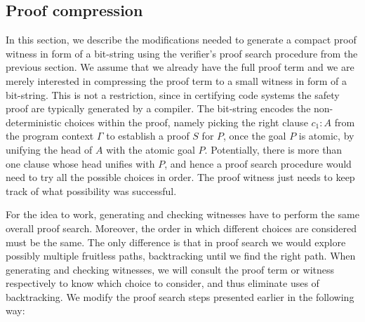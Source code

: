 \documentclass{llncs}
\begin{document}
\subsection{Proof compression}
In this section, we describe the modifications needed to generate
a compact proof witness in form of a bit-string using the verifier's
proof search procedure from the previous section. 
We assume that we already have the full proof term and we are merely
interested in compressing the proof term to a small witness in form of
a bit-string. This is not a restriction, since in certifying code
systems the safety proof are typically generated by a compiler. 
The bit-string encodes the non-deterministic choices within the proof,
namely picking the right clause $c_1{:}A$ from the program context
$\Gamma$ to establish a proof $S$ for $P$, once the goal $P$ is
atomic, by unifying the head of $A$ with the atomic goal
$P$. Potentially, there is more than one clause whose head unifies
with $P$, and hence a proof search procedure would need to try all the
possible choices in order. The proof witness just needs to keep track
of what possibility was successful.


For the idea to work, generating and checking witnesses have to
perform  the same overall proof search. Moreover, the order 
in which different choices are considered must be the same.  The only
difference is that in proof search we would explore possibly multiple
fruitless paths, backtracking until we find the right path. When
generating and checking witnesses, we will consult the proof term
or witness respectively to know which choice to consider, and thus
eliminate uses of backtracking.
We modify the proof search steps presented earlier in the following
way:
\end{document}
